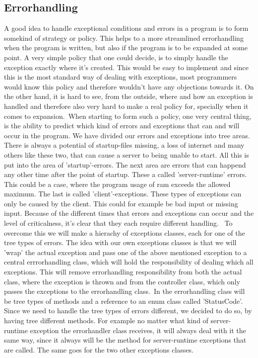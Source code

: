 \documentclass[a4paper,10pt,titlepage]{article}
\begin{document}
		\subsection{Errorhandling}
			A good idea to handle exceptional conditions and errors in a program is to form somekind of strategy or policy. This helps to a more streamlined errorhandling
			when the program is written, but also if the program is to be expanded at some point. A very simple policy that one could decide, is to
			simply handle the exception exactly where it's created. This would be easy to implement and since this is the most standard way of dealing with
			exceptions, most programmers would know this policy and therefore wouldn't have any objections towards it. On the other hand, it is hard to see, from
			the outside, where and how an exception is handled and therefore also very hard to make a real policy for, specially when it comes to expansion.\
			When starting to form such a policy, one very central thing, is the ability to predict which kind of errors and exceptions that can and will 
			occur in the program. We have divided our errors and exceptions into tree areas. There is always a potential of startup-files missing, a loss of internet and many others like these two, that can cause a server to being unable to start. All this is put into the area of 'startup'-errors. The next area are errors that can happend any other time after the point of startup. These a called 'server-runtime' errors. This could be a case, where the program usage of ram exceeds the allowed maximum. The last is called 'client'-exceptions. These types of exceptions can only be caused by the client. This could for example be bad input or missing input.  Because of the different times that errors and exceptions can occur and the level of criticalness, it's clear that they each require different handling. \
			To overcome this we will make a hierachy of exceptions classes, each for one of the tree types of errors. The idea with our own exceptions classes is that we will 'wrap' the actual exception and pass one of the above mentioned exception to a central errrorhandling class, which will hold the responsibility of dealing which all exceptions. This will remove errorhandling responsibility from both the actual class, where the exception is thrown and from the controller class, which only passes the exceptions to the errorhandling class.\
			In the errorhandling class will be tree types of methods and a reference to an enum class called 'StatusCode'. Since we need to handle the tree types of errors different, we decided to do so, by having tree different methods. For example no matter what kind of server-runtime exception the errorhandler class receives, it will always deal with it the same way, since it always will be the method for server-runtime exceptions that are called. The same goes for the two other exceptions classes.\
\end{document}
